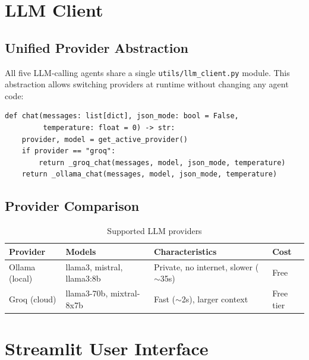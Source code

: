 \documentclass[12pt,a4paper]{report}
\begin{document}
\chapter{LLM Client}
\label{ch:llm}

\section{Unified Provider Abstraction}

All five LLM-calling agents share a single \texttt{utils/llm\_client.py} module. This
abstraction allows switching providers at runtime without changing any agent code:

\begin{lstlisting}[caption={Unified LLM client dispatcher}]
def chat(messages: list[dict], json_mode: bool = False,
         temperature: float = 0) -> str:
    provider, model = get_active_provider()
    if provider == "groq":
        return _groq_chat(messages, model, json_mode, temperature)
    return _ollama_chat(messages, model, json_mode, temperature)
\end{lstlisting}

\section{Provider Comparison}

\begin{table}[H]
  \centering
  \caption{Supported LLM providers}
  \label{tab:providers}
  \renewcommand{\arraystretch}{1.3}
  \begin{tabularx}{\textwidth}{lXXl}
    \toprule
    \textbf{Provider} & \textbf{Models} & \textbf{Characteristics} & \textbf{Cost} \\
    \midrule
    Ollama (local)  & llama3, mistral, llama3:8b & Private, no internet, slower ($\sim$35s) & Free \\
    Groq (cloud)    & llama3-70b, mixtral-8x7b   & Fast ($\sim$2s), larger context & Free tier \\
    \bottomrule
  \end{tabularx}
\end{table}

\chapter{Streamlit User Interface}
\label{ch:ui}
\end{document}
